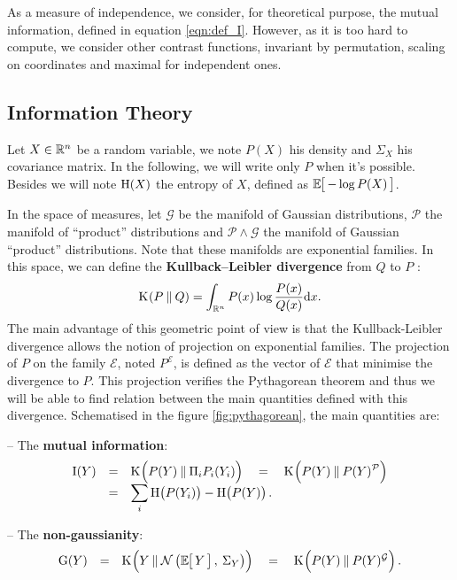 \documentclass[a4paper]{article}
\newcommand{\Kl}[3][]{\mathrm K_{#1}\!\zp{#2\:\|\:#3}}
\newcommand{\zZ}[2]{\mathrm #1\!\zp{#2}}
\newcommand{\zD}{\mathcal}
\newcommand{\Ng}[2]{\mathcal{N}\zp{#1,\:#2}}
\newcommand{\zmev}[1]{\textbf{#1}}
\begin{document}
As a measure of independence, we consider, for theoretical purpose,
the mutual information, defined in equation \ref{eqn:def_I}.
However, as it is too hard to compute, we consider other contrast functions, invariant by permutation, scaling on coordinates and maximal for independent ones.



\subsection{Information Theory}
\label{infth}
Let $X\in\mathbb{R}^n$ be a random variable, we note $P(X)$ his density and $\Sigma_X$ his covariance matrix. In the following, we will write only $P$ when it's possible. Besides we will note $\zZ HX$ the entropy of $X$, defined as $\zesp{-\log P(X)}$.

\znl

In the space of measures, let $\zD G$ be the manifold of Gaussian distributions, $\zD P$ the manifold of ``product'' distributions and $\zD P\wedge\zD G$ the manifold of Gaussian ``product'' distributions. Note that these manifolds are exponential families.
In this space, we can define the \zmev{Kullback--Leibler divergence} from $Q$ to $P$ :
\begin{equation}
  \Kl PQ = \int_{\zR^n} P(x) \log\frac{P(x)}{Q(x)} \zdx x.
\end{equation}
The main advantage of this geometric point of view is that the Kullback-Leibler divergence allows the notion of projection on exponential families.
The projection of $P$ on the family $\zD E$, noted $P^{\zD E}$, is defined as the vector of $\zD E$ that minimise the divergence to $P$.
This projection verifies the Pythagorean theorem and thus we will be able to find relation between the main quantities defined with this divergence.
Schematised in the figure \ref{fig:pythagorean}, the main quantities are:

-- The \zmev{mutual information}:
\begin{equation}\label{eqn:def_I}\begin{array}{rcl}
  \zZ IY &=&\displaystyle \Kl {\zpbig2 P(Y)}{\Pi_i P_i(Y_i)} \quad=\quad \Kl {\zpbig2 P(Y)}{P(Y)^{\zD P}}\\
&=&\displaystyle \sum_i \zZ H{\zpbig1P(Y_i)} - \zZ H{\zpbig1P(Y)}.
\end{array}\end{equation}

-- The \zmev{non-gaussianity}:
\begin{equation}\begin{array}{rcl}
  \zZ GY &=& \Kl{Y}{\Ng{\zesp Y}{\Sigma_Y}\zpbig2} \quad=\quad \Kl {\zpbig2 P(Y)}{P(Y)^{\zD G}}.
\end{array}\end{equation}
\end{document}
